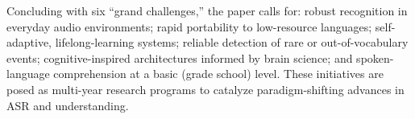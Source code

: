 \bigskip

Concluding with six “grand challenges,” the paper calls for: robust recognition in everyday audio environments; rapid portability to low-resource languages; self-adaptive, lifelong-learning systems; reliable detection of rare or out-of-vocabulary events; cognitive-inspired architectures informed by brain science; and spoken-language comprehension at a basic (grade school) level. These initiatives are posed as multi-year research programs to catalyze paradigm-shifting advances in ASR and understanding.
